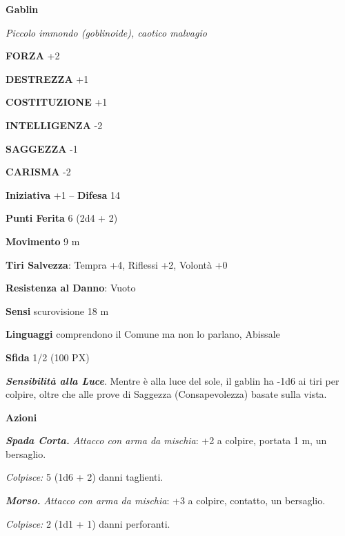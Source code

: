 \begin{multicols}{2}
	\medskip{}\textbf{Gablin}

	\textit{Piccolo immondo (goblinoide), caotico malvagio}

	\textbf{FORZA} +2

	\textbf{DESTREZZA} +1

	\textbf{COSTITUZIONE} +1

	\textbf{INTELLIGENZA} -2

	\textbf{SAGGEZZA} -1

	\textbf{CARISMA} -2

	\textbf{Iniziativa} +1 -- \textbf{Difesa} 14

	\textbf{Punti Ferita} 6 (2d4 + 2)

	\textbf{Movimento} 9 m

	\textbf{Tiri Salvezza}: Tempra +4, Riflessi +2, Volontà +0

	\textbf{Resistenza al Danno}: Vuoto

	\textbf{Sensi} scurovisione 18 m

	\textbf{Linguaggi} comprendono il Comune ma non lo parlano, Abissale

	\textbf{Sfida} 1/2 (100 PX)

	\textit{\textbf{Sensibilità alla Luce}}. Mentre è alla luce del sole, il gablin  ha -1d6 ai tiri per colpire, oltre che alle prove di Saggezza (Consapevolezza) basate sulla vista.

	\textbf{Azioni}

	\textit{\textbf{Spada Corta.} Attacco con arma da mischia}: +2 a colpire, portata 1 m, un bersaglio.

	\textit{Colpisce:} 5 (1d6 + 2) danni taglienti.

	\textit{\textbf{Morso.} Attacco con arma da mischia}: +3 a colpire, contatto, un bersaglio.

	\textit{Colpisce:} 2 (1d1 + 1) danni perforanti.


\end{multicols}
